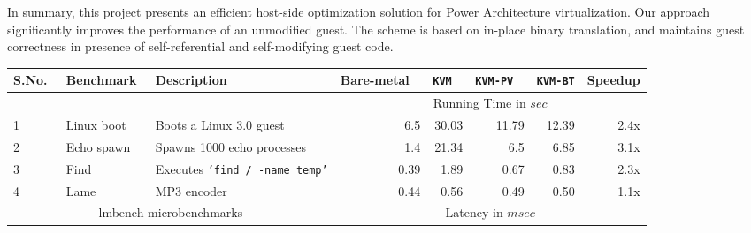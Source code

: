 In summary, this project presents an efficient host-side optimization solution for Power Architecture virtualization. Our approach significantly improves the performance of an unmodified guest. The scheme is based on in-place binary translation, and maintains guest correctness in presence of self-referential and self-modifying guest code.

\begin{table*}
\centering
      \begin{tabular}{|l@{} | p{3.0cm} |p{3.8cm} | r r r r r|} \hline
        S.No.\verb, ,&  Benchmark\verb, ,& Description  & Bare-metal \verb, ,& {\tt KVM} \verb, , & {\tt KVM-PV} \verb, ,& {\tt KVM-BT}& Speedup \\ \hline

     &&& \multicolumn{5}{c|}{ Running Time in $sec$}\\\cline {4-8}  
      1&  Linux boot& Boots a Linux 3.0 guest & 6.5	&	30.03	&	11.79	&	12.39 & 2.4x \\ \hline
      2& Echo spawn	& Spawns 1000 echo processes &1.4	&	21.34	&	6.5	&	6.85& 3.1x \\\hline
      3& Find	& Executes {\tt 'find / -name temp'} & 0.39	&	1.89	&	0.67	&	0.83 & 2.3x\\ \hline
      4& Lame	& MP3 encoder & 0.44	&	0.56	&	0.49	&	0.50 & 1.1x\\ \hline
	   \multicolumn{3}{|c|}{ lmbench microbenchmarks }& \multicolumn{5}{c|}{Latency in $msec$}\\  \hline


\end{tabular}
\end{table*}
